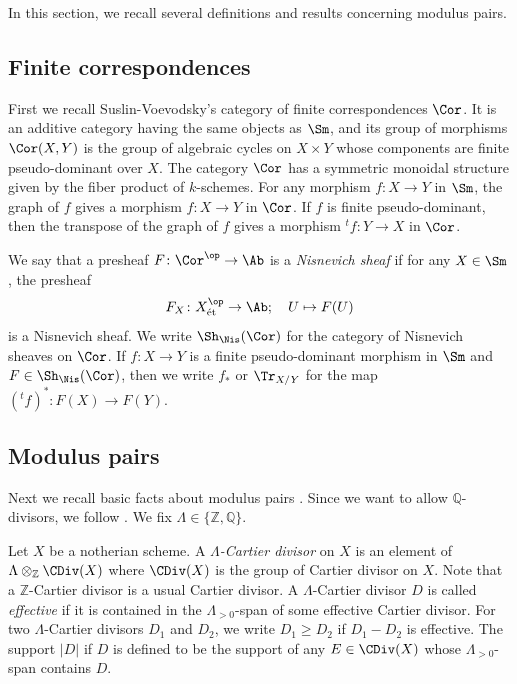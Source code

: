\documentclass{amsart}
\theoremstyle{plain}
\theoremstyle{definition}
\theoremstyle{remark}
\numberwithin{equation}{section}
\def\et{\mathrm{\acute{e}t}}
\begin{document}
In this section, we recall several definitions and results concerning modulus pairs.

\subsection{Finite correspondences}

First we recall Suslin-Voevodsky's category of finite correspondences $\Cor$.
It is an additive category having the same objects as $\Sm$, and its group of morphisms $\Cor(X,Y)$ is the group of algebraic cycles on $X\times Y$ whose components are finite pseudo-dominant over $X$.
The category $\Cor$ has a symmetric monoidal structure given by the fiber product of $k$-schemes.
For any morphism $f\colon X\to Y$ in $\Sm$, the graph of $f$ gives a morphism $f\colon X\to Y$ in $\Cor$.
If $f$ is finite pseudo-dominant, then the transpose of the graph of $f$ gives a morphism ${}^tf\colon Y\to X$ in $\Cor$.

We say that a presheaf $F\colon \Cor^\op\to \Ab$ is a \emph{Nisnevich sheaf} if for any $X\in \Sm$, the presheaf
$$
    F_X\colon X_\et^\op\to \Ab;\quad U\mapsto F(U)
$$
is a Nisnevich sheaf.
We write $\Sh_\Nis(\Cor)$ for the category of Nisnevich sheaves on $\Cor$.
If $f\colon X\to Y$ is a finite pseudo-dominant morphism in $\Sm$ and $F\in \Sh_\Nis(\Cor)$, then we write $f_*$ or $\Tr_{X/Y}$ for the map $({}^tf)^*\colon F(X)\to F(Y)$.


\subsection{Modulus pairs}

Next we recall basic facts about modulus pairs \cite{KMSY1}.
Since we want to allow $\mathbb{Q}$-divisors, we follow \cite{Koizumi-Miyazaki}.
We fix $\Lambda\in \{\mathbb{Z},\mathbb{Q}\}$.

Let $X$ be a notherian scheme.
A \emph{$\Lambda$-Cartier divisor} on $X$ is an element of $\Lambda\otimes_\mathbb{Z}\CDiv(X)$ where $\CDiv(X)$ is the group of Cartier divisor on $X$.
Note that a $\mathbb{Z}$-Cartier divisor is a usual Cartier divisor.
A $\Lambda$-Cartier divisor $D$ is called \emph{effective} if it is contained in the $\Lambda_{>0}$-span of some effective Cartier divisor. 
For two $\Lambda$-Cartier divisors $D_1$ and $D_2$, we write $D_1\geq D_2$ if $D_1-D_2$ is effective.
The support $|D|$ if $D$ is defined to be the support of any $E\in \CDiv(X)$ whose $\Lambda_{>0}$-span contains $D$.
\end{document}
